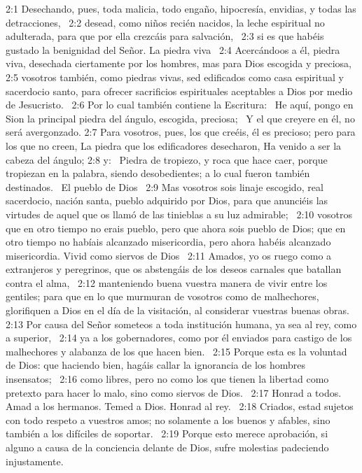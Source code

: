 2:1 Desechando, pues, toda malicia, todo engaño, hipocresía, envidias, y todas las detracciones,  
2:2 desead, como niños recién nacidos, la leche espiritual no adulterada, para que por ella crezcáis para salvación,  
2:3 si es que habéis gustado la benignidad del Señor. 
La piedra viva  
2:4 Acercándoos a él, piedra viva, desechada ciertamente por los hombres, mas para Dios escogida y preciosa,  
2:5 vosotros también, como piedras vivas, sed edificados como casa espiritual y sacerdocio santo, para ofrecer sacrificios espirituales aceptables a Dios por medio de Jesucristo.  
2:6 Por lo cual también contiene la Escritura:  
He aquí, pongo en Sion la principal piedra del ángulo, escogida, preciosa;  
Y el que creyere en él, no será avergonzado. 
2:7 Para vosotros, pues, los que creéis, él es precioso; pero para los que no creen, La piedra que los edificadores desecharon, Ha venido a ser la cabeza del ángulo; 
2:8 y:  
Piedra de tropiezo, y roca que hace caer, porque tropiezan en la palabra, siendo desobedientes; a lo cual fueron también destinados.  
El pueblo de Dios  
2:9 Mas vosotros sois linaje escogido, real sacerdocio, nación santa, pueblo adquirido por Dios, para que anunciéis las virtudes de aquel que os llamó de las tinieblas a su luz admirable;  
2:10 vosotros que en otro tiempo no erais pueblo, pero que ahora sois pueblo de Dios; que en otro tiempo no habíais alcanzado misericordia, pero ahora habéis alcanzado misericordia. 
Vivid como siervos de Dios  
2:11 Amados, yo os ruego como a extranjeros y peregrinos, que os abstengáis de los deseos carnales que batallan contra el alma,  
2:12 manteniendo buena vuestra manera de vivir entre los gentiles; para que en lo que murmuran de vosotros como de malhechores, glorifiquen a Dios en el día de la visitación, al considerar vuestras buenas obras.  
2:13 Por causa del Señor someteos a toda institución humana, ya sea al rey, como a superior,  
2:14 ya a los gobernadores, como por él enviados para castigo de los malhechores y alabanza de los que hacen bien.  
2:15 Porque esta es la voluntad de Dios: que haciendo bien, hagáis callar la ignorancia de los hombres insensatos;  
2:16 como libres, pero no como los que tienen la libertad como pretexto para hacer lo malo, sino como siervos de Dios.  
2:17 Honrad a todos. Amad a los hermanos. Temed a Dios. Honrad al rey.  
2:18 Criados, estad sujetos con todo respeto a vuestros amos; no solamente a los buenos y afables, sino también a los difíciles de soportar.  
2:19 Porque esto merece aprobación, si alguno a causa de la conciencia delante de Dios, sufre molestias padeciendo injustamente.  
